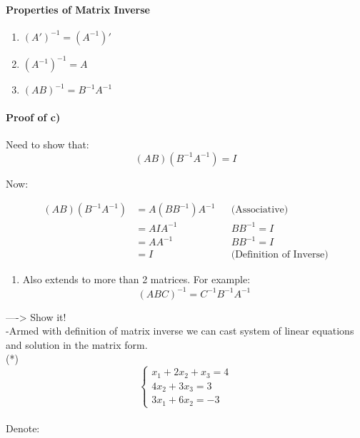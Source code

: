 \documentclass[]{article}
\providecommand{\tightlist}{%
  \setlength{\itemsep}{0pt}\setlength{\parskip}{0pt}}
\let\oldparagraph\paragraph
\renewcommand{\paragraph}[1]{\oldparagraph{#1}\mbox{}}
\begin{document}
\paragraph{\texorpdfstring{Properties of Matrix Inverse\\
}{Properties of Matrix Inverse }}\label{properties-of-matrix-inverse}

\begin{enumerate}
\def\labelenumi{\alph{enumi})}
\tightlist
\item
  \((A')^{-1}=(A^{-1})'\)\\
\item
  \((A^{-1})^{-1}=A\)\\
\item
  \((AB)^{-1}=B^{-1}A^{-1}\)\\
\end{enumerate}

\paragraph{\texorpdfstring{Proof of c)\\
}{Proof of c) }}\label{proof-of-c}

Need to show that:\\
 \[(AB)(B^{-1}A^{-1})= I\]

Now:

\begin{align}
    (AB)(B^{-1}A^{-1}) &=A(BB^{-1})A^{-1}&& \text{(Associative}  \text{)}\\
     &=AIA^{-1} && BB^{-1}=I \\
     &=AA^{-1}   && BB^{-1}=I \\
     &=I &&\text{(Definition of Inverse}  \text{)}
\end{align}

\begin{enumerate}
\def\labelenumi{\alph{enumi})}
\setcounter{enumi}{2}
\tightlist
\item
  Also extends to more than 2 matrices. For example:\\
  \[(ABC)^{-1}=C^{-1}B^{-1}A^{-1}\]
\end{enumerate}

----\textgreater{} Show it!\\
 -Armed with definition of matrix inverse we can cast system of linear
equations and solution in the matrix form.\\

(*)
\[\begin{cases} x_1 + 2x_2 +x_3= 4\\ 4x_2 + 3x_3 = 3\\3x_1 + 6x_2 = -3 \end{cases}\]\\[2\baselineskip]
Denote:\\
\end{document}
